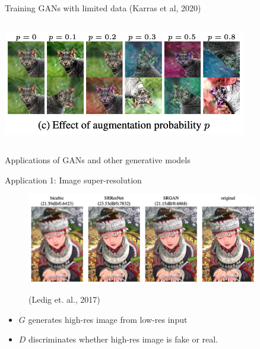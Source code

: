 \documentclass[8pt,xcolor=table,aspectratio=169]{beamer}
\begin{document}
\begin{frame}{Training GANs with limited data (Karras et al, 2020)}
\begin{columns}
\begin{column}{0.5\textwidth}
\vspace{2em}

\includegraphics[width=0.8\textwidth]{KBfO0EF.png}
\end{column}
\end{columns}



\end{frame}

\begin{frame}[plain, c]

\begin{center}
\Huge Applications of GANs and other generative models
\end{center}

\end{frame}

\begin{frame}{Application 1: Image super-resolution}

\begin{figure}
\centering
\includegraphics[width=0.9\textwidth]{mVwQduX.jpg}

(Ledig et. al., 2017)
\end{figure}

\begin{itemize}
\item $G$ generates high-res image from low-res input 
\item $D$ discriminates whether high-res image is fake or real. 
\end{itemize}

\end{frame}
\end{document}
